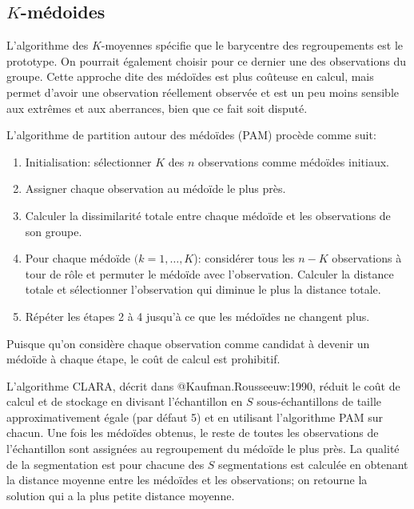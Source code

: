 \documentclass[
  11pt,
  letterpaper,
]{book}
\providecommand{\tightlist}{%
  \setlength{\itemsep}{0pt}\setlength{\parskip}{0pt}}\usepackage{longtable,booktabs,array}
\theoremstyle{definition}
\theoremstyle{remark}
\begin{document}
\hypertarget{k-muxe9doides}{%
\subsection{\texorpdfstring{\(K\)-médoides}{K-médoides}}\label{k-muxe9doides}}

L'algorithme des \(K\)-moyennes spécifie que le barycentre des
regroupements est le prototype. On pourrait également choisir pour ce
dernier une des observations du groupe. Cette approche dite des médoïdes
est plus coûteuse en calcul, mais permet d'avoir une observation
réellement observée et est un peu moins sensible aux extrêmes et aux
aberrances, bien que ce fait soit disputé.

L'algorithme de partition autour des médoïdes (PAM) procède comme suit:

\begin{enumerate}
\def\labelenumi{\arabic{enumi}.}
\tightlist
\item
  Initialisation: sélectionner \(K\) des \(n\) observations comme
  médoïdes initiaux.
\item
  Assigner chaque observation au médoïde le plus près.
\item
  Calculer la dissimilarité totale entre chaque médoïde et les
  observations de son groupe.
\item
  Pour chaque médoïde \((k=1, \ldots, K\)): considérer tous les \(n-K\)
  observations à tour de rôle et permuter le médoïde avec l'observation.
  Calculer la distance totale et sélectionner l'observation qui diminue
  le plus la distance totale.
\item
  Répéter les étapes 2 à 4 jusqu'à ce que les médoïdes ne changent plus.
\end{enumerate}

Puisque qu'on considère chaque observation comme candidat à devenir un
médoïde à chaque étape, le coût de calcul est prohibitif.

L'algorithme CLARA, décrit dans @Kaufman.Rousseeuw:1990, réduit le coût
de calcul et de stockage en divisant l'échantillon en \(S\)
sous-échantillons de taille approximativement égale (par défaut 5) et en
utilisant l'algorithme PAM sur chacun. Une fois les médoïdes obtenus, le
reste de toutes les observations de l'échantillon sont assignées au
regroupement du médoïde le plus près. La qualité de la segmentation est
pour chacune des \(S\) segmentations est calculée en obtenant la
distance moyenne entre les médoïdes et les observations; on retourne la
solution qui a la plus petite distance moyenne.
\end{document}
